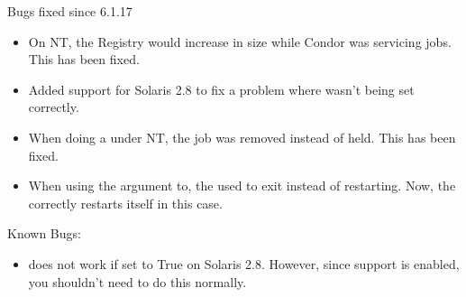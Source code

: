 \noindent Bugs fixed since 6.1.17
\begin{itemize}

\item On NT, the Registry would increase in size while Condor was
servicing jobs. This has been fixed.

\item Added  support for Solaris 2.8 to fix a problem where
 wasn't being set correctly.

\item When doing a  under NT, the job was removed instead of
held. This has been fixed.

\item When using the  argument to, the
 used to exit instead of restarting.
Now, the  correctly restarts itself in this case.

\end{itemize}

\noindent Known Bugs:
\begin{itemize}

\item {} does not work if set to True on Solaris 
2.8.  However, since  support is enabled, you shouldn't
need to do this normally.

\end{itemize}
